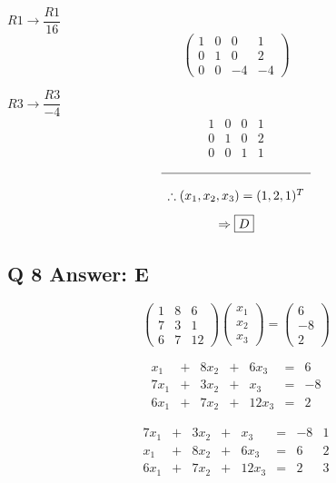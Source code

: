 \documentclass[a4paper,11pt]{article}
\begin{document}
\( R1 \rightarrow \dfrac{R1}{16} \)
\[ \left(\begin{array}{rrr|r} 1 & 0 & 0 & 1 \\ 0 & 1 & 0 & 2 \\ 0 & 0 & -4 & -4 \end{array}\right) \]

\( R3 \rightarrow \dfrac{R3}{-4} \)
\[ \begin{array}{rrr|r} 1 & 0 & 0 & 1 \\ 0 & 1 & 0 & 2 \\ 0 & 0 & 1 & 1  \end{array} \]

\[\begin{array}{c} \hline \\
    \therefore (x_1,x_2,x_3) = (1,2,1)^T \\ [3mm]
    \Rightarrow \boxed{D}
\end{array}\]

\subsection*{Q 8 Answer: E}

\[\begin{pmatrix} 1 & 8 & 6 \\ 7 & 3 & 1 \\ 6 & 7 & 12 \end{pmatrix}\begin{pmatrix} x_1 \\ x_2 \\ x_3  \end{pmatrix} = \begin{pmatrix} 6 \\ -8 \\ 2 \end{pmatrix}\]

\[\begin{array}{ccccccc}
     x_1 & + & 8x_2 & + &  6x_3 & = & 6 \\
    7x_1 & + & 3x_2 & + &   x_3 & = & -8 \\
    6x_1 & + & 7x_2 & + & 12x_3 & = & 2 
\end{array}\]

\[\begin{array}{ccccccc|c}
     7x_1 & + & 3x_2 & + &   x_3 & = & -8 & 1 \\
      x_1 & + & 8x_2 & + &  6x_3 & = &  6 & 2 \\
     6x_1 & + & 7x_2 & + & 12x_3 & = &  2 & 3
\end{array}\]
\end{document}
